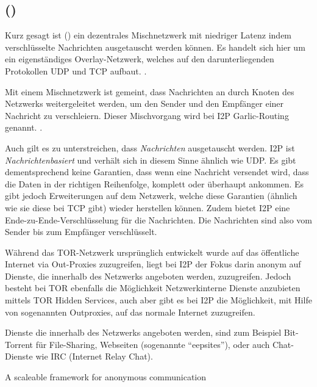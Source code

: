 \subsection{ ()}

Kurz gesagt ist  () ein dezentrales Mischnetzwerk mit niedriger Latenz indem verschlüsselte Nachrichten ausgetauscht werden können.
\parencite{zantout_i2p_2011}
Es handelt sich hier um ein eigenständiges Overlay-Netzwerk, welches auf den darunterliegenden Protokollen UDP und TCP aufbaut.  \parencite{de_boer_invisible_2019,astolfi_i2p_2015}.

Mit einem Mischnetzwerk ist gemeint, dass Nachrichten an durch Knoten des Netzwerks weitergeleitet werden, um den Sender und den Empfänger einer Nachricht zu verschleiern. Dieser Mischvorgang wird bei I2P Garlic-Routing genannt.
\parencite[S.~1]{zantout_i2p_2011}.

Auch gilt es zu unterstreichen, dass \textit{Nachrichten} ausgetauscht werden.
I2P ist \textit{Nachrichtenbasiert} und verhält sich in diesem Sinne ähnlich wie UDP.
Es gibt dementsprechend keine Garantien, dass wenn eine Nachricht versendet wird, dass die Daten in der richtigen Reihenfolge, komplett oder überhaupt ankommen.
Es gibt jedoch Erweiterungen auf dem Netzwerk, welche diese Garantien (ähnlich wie sie diese bei TCP gibt) wieder herstellen können.
Zudem bietet I2P eine Ende-zu-Ende-Verschlüsselung für die Nachrichten. Die Nachrichten sind also vom Sender bis zum Empfänger verschlüsselt.

Während das TOR-Netzwerk ursprünglich entwickelt wurde auf das öffentliche Internet via Out-Proxies zuzugreifen,
liegt bei I2P der Fokus darin anonym auf Dienste, die innerhalb des Netzwerks angeboten werden, zuzugreifen.
Jedoch besteht bei TOR ebenfalls die Möglichkeit Netzwerkinterne Dienste anzubieten mittels TOR Hidden Services, auch aber gibt es bei I2P die Möglichkeit, mit Hilfe von sogenannten Outproxies, auf das normale Internet zuzugreifen.

Dienste die innerhalb des Netzwerks angeboten werden, sind zum Beispiel Bit-Torrent für File-Sharing, Webseiten (sogenannte ``eepsites''), oder auch Chat-Dienste wie IRC (Internet Relay Chat).
\parencite[p.~3-4]{de_boer_invisible_2019}

\cite{astolfi_i2p_2015}

\cite{timpanaro_birds_2012}

\cite{timpanaro_evaluation_2015}

A scaleable framework for anonymous communication
\cite{noauthor_i2p_nodate-8}


